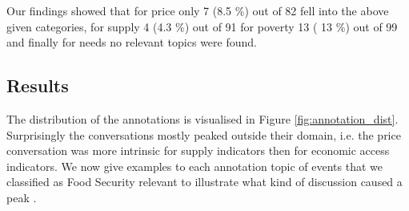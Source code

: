 Our findings showed that for price only 7 (8.5 \%) out of 82 fell into the above given categories, for  supply 4 (4.3 \%) out of 91 for poverty 13 ( 13 \%) out of 99 and finally for needs no relevant topics were found. 


\subsection{Results}
\label{an_result}

The distribution of the annotations is visualised in Figure \ref{fig:annotation_dist}. Surprisingly the conversations mostly peaked outside their domain, i.e. the price conversation was more intrinsic for supply indicators then for economic access indicators. We now give examples to each annotation topic of events that we classified as Food Security relevant to illustrate what kind of discussion caused a peak . 




